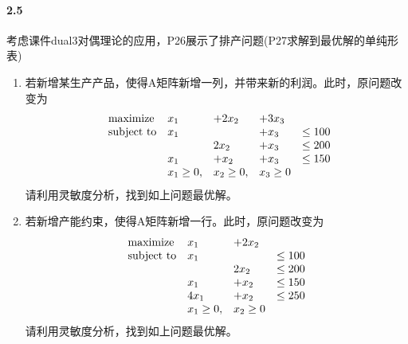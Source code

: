 \documentclass[12pt,a4paper]{article}
\begin{document}
 \paragraph{2.5}
考虑课件dual3对偶理论的应用，P26展示了排产问题(P27求解到最优解的单纯形表)
 \begin{enumerate}
 	\item 若新增某生产产品，使得A矩阵新增一列，并带来新的利润。此时，原问题改变为
 	\begin{equation*}
 	\begin{array}{lllll@{}ll}
 	\text{maximize}  & x_1&+2x_2 &+3x_3&\\
\text{subject to}& x_1 &&+x_3    &\leq 100 \\
	&  &2x_2  &+x_3  &\leq 200 \\
 	&x_1 &+x_2  &+x_3  &\leq 150  \\
 	&x_1 \geq 0, &x_2 \geq 0, &x_3 \geq 0& 
 	\end{array}
 	\end{equation*}
 	请利用灵敏度分析，找到如上问题最优解。
	
	
 	\item 若新增产能约束，使得A矩阵新增一行。此时，原问题改变为
 	\begin{equation*}
 	\begin{array}{lllll@{}ll}
 	\text{maximize}  & x_1&+2x_2 &\\
 	\text{subject to}& x_1 &  &\leq 100 \\
 	&  &2x_2    &\leq 200 \\
	&x_1 &+x_2   &\leq 150  \\
 	&4x_1 &+x_2   &\leq 250  \\
	&x_1 \geq 0, &x_2 \geq 0 &
 	\end{array}
 	\end{equation*}
	请利用灵敏度分析，找到如上问题最优解。
		
	
 \end{enumerate}
\end{document}
